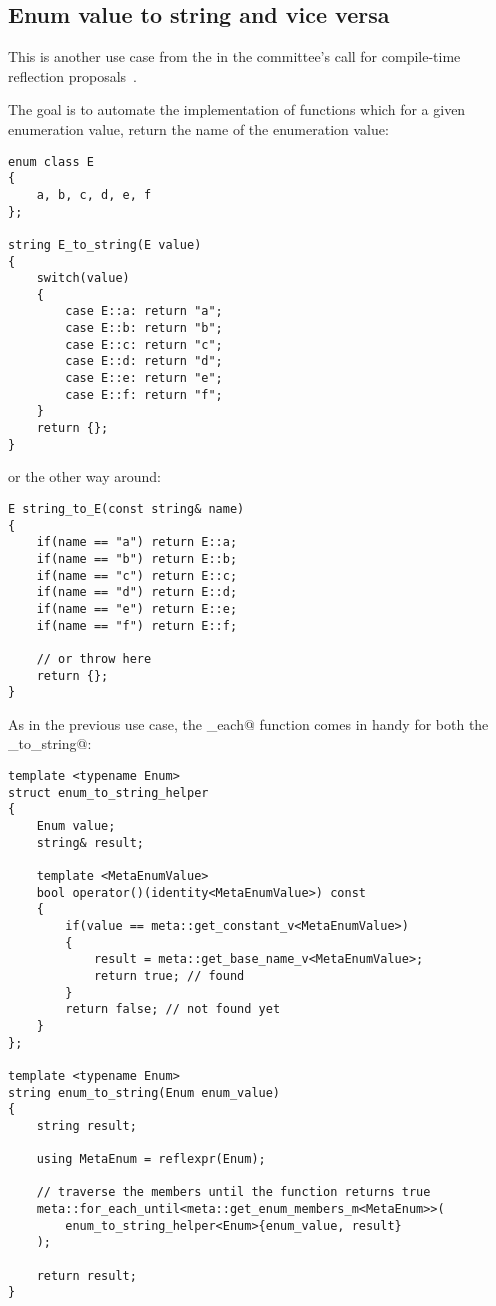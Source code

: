 \subsection{Enum value to string and vice versa}
\label{use-case-enum-to-string}

This is another use case from the  in the committee's
call for compile-time reflection proposals~\cite{ISOCPP-N3814}. 

The goal is to automate the implementation of functions which for a given
enumeration value, return the name of the enumeration value:

\begin{verbatim}
enum class E
{
	a, b, c, d, e, f
};

string E_to_string(E value)
{
	switch(value)
	{
		case E::a: return "a";
		case E::b: return "b";
		case E::c: return "c";
		case E::d: return "d";
		case E::e: return "e";
		case E::f: return "f";
	}
	return {};
}
\end{verbatim}

or the other way around:

\begin{verbatim}
E string_to_E(const string& name)
{
	if(name == "a") return E::a;
	if(name == "b") return E::b;
	if(name == "c") return E::c;
	if(name == "d") return E::d;
	if(name == "e") return E::e;
	if(name == "f") return E::f;

	// or throw here
	return {};
}
\end{verbatim}

As in the previous use case, the \verb@for_each@ function comes in handy
for both the \verb@enum_to_string@:

\begin{verbatim}
template <typename Enum>
struct enum_to_string_helper
{
	Enum value;
	string& result;

	template <MetaEnumValue>
	bool operator()(identity<MetaEnumValue>) const
	{
		if(value == meta::get_constant_v<MetaEnumValue>)
		{
			result = meta::get_base_name_v<MetaEnumValue>;
			return true; // found
		}
		return false; // not found yet
	}
};

template <typename Enum>
string enum_to_string(Enum enum_value)
{
	string result;

	using MetaEnum = reflexpr(Enum);

	// traverse the members until the function returns true
	meta::for_each_until<meta::get_enum_members_m<MetaEnum>>(
		enum_to_string_helper<Enum>{enum_value, result}
	);

	return result;
}
\end{verbatim}

